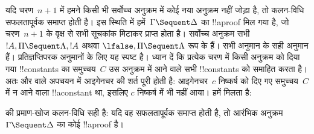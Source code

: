 \documentclass[../../../include/open-logic-section]{subfiles}
\begin{document}
यदि चरण~$n+1$ में हमने किसी भी सर्वोच्च अनुक्रम में कोई नया अनुक्रम नहीं जोड़ा
है, तो कलन-विधि सफलतापूर्वक समाप्त होती है। इस स्थिति में हमें~$\Gamma
\Sequent \Delta$ का !!a{proof} मिल गया है, जो चरण~$n+1$ के वृक्ष से सभी
सूचकांक मिटाकर प्राप्त होता है। सर्वोच्च अनुक्रम सभी $!A, \Pi \Sequent
\Lambda, !A$ अथवा $\lfalse, \Pi \Sequent \Lambda$ रूप के हैं। सभी अनुमान
 के सही अनुमान हैं। प्रतिज्ञप्तिपरक अनुमानों के लिए यह स्पष्ट है।
ध्यान दें कि प्रत्येक चरण में किसी अनुक्रम को दिया गया !!{constant}s का
समुच्चय~$C$ उस अनुक्रम में आने वाले सभी !!{constant}s को समाहित करता है। अतः
\LeftR{\lexists} और \RightR{\lforall} वाले अपचयन में आइगेनचर की शर्त पूरी
होती है: आइगेनचर~$c$ निष्कर्ष को दिए गए समुच्चय~$C$ में न आने वाला
!!a{constant} था, इसलिए $c$ निष्कर्ष में भी नहीं आया। हमें मिलता है:

\begin{prop}
 की प्रमाण-खोज कलन-विधि सही है: यदि वह सफलतापूर्वक समाप्त होती है,
तो आरंभिक अनुक्रम~$\Gamma \Sequent \Delta$ का कोई !!a{proof} है।
\end{prop}
\end{document}
